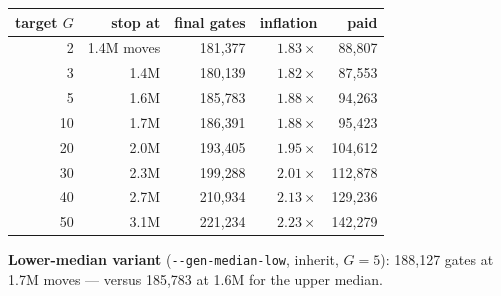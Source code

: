 \documentclass[11pt]{article}
\newcommand{\code}[1]{\texttt{#1}}
\begin{document}
\begin{center}
\begin{tabular}{rrrrr}
\toprule
target $G$ & stop at & final gates & inflation & paid \\
\midrule
2 & 1.4M moves & 181{,}377 & $1.83\times$ & 88{,}807 \\
3 & 1.4M & 180{,}139 & $1.82\times$ & 87{,}553 \\
5 & 1.6M & 185{,}783 & $1.88\times$ & 94{,}263 \\
10 & 1.7M & 186{,}391 & $1.88\times$ & 95{,}423 \\
20 & 2.0M & 193{,}405 & $1.95\times$ & 104{,}612 \\
30 & 2.3M & 199{,}288 & $2.01\times$ & 112{,}878 \\
40 & 2.7M & 210{,}934 & $2.13\times$ & 129{,}236 \\
50 & 3.1M & 221{,}234 & $2.23\times$ & 142{,}279 \\
\bottomrule
\end{tabular}
\end{center}

\noindent\textbf{Lower-median variant} (\code{-{}-gen-median-low}, inherit,
$G=5$): 188{,}127 gates at 1.7M moves --- versus 185{,}783 at 1.6M for the
upper median.
\end{document}

